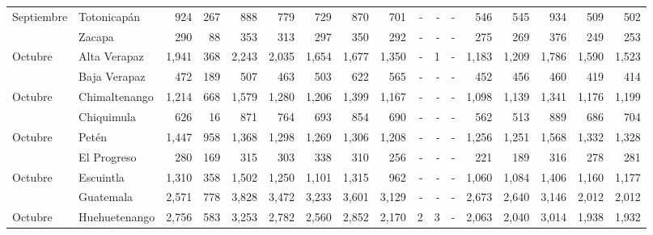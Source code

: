 \begin{landscape}
\begin{center}
\begin{longtable}{llrrrrrrrrrrrrrrr}
\multicolumn{1}{l}{	\footnotesize	 Septiembre 	}&	 Totonicapán 	&	 924 	&	 267 	&	 888 	&	 779 	&	 729 	&	 870 	&	 701 	&	 -   	&	 -   	&	 -   	&	 546 	&	 545 	&	 934 	&	 509 	&	 502 	\\
\rowcolor{color1!5!white}\multicolumn{1}{l}{	\footnotesize	 Septiembre 	}&	 Zacapa 	&	 290 	&	 88 	&	 353 	&	 313 	&	 297 	&	 350 	&	 292 	&	 -   	&	 -   	&	 -   	&	 275 	&	 269 	&	 376 	&	 249 	&	 253 	\\
\multicolumn{1}{l}{	\footnotesize	 Octubre 	}&	 Alta Verapaz 	&	 1,941 	&	 368 	&	 2,243 	&	 2,035 	&	 1,654 	&	 1,677 	&	 1,350 	&	 -   	&	 1 	&	 -   	&	 1,183 	&	 1,209 	&	 1,786 	&	 1,590 	&	 1,523 	\\
\rowcolor{color1!5!white}\multicolumn{1}{l}{	\footnotesize	 Octubre 	}&	 Baja Verapaz 	&	 472 	&	 189 	&	 507 	&	 463 	&	 503 	&	 622 	&	 565 	&	 -   	&	 -   	&	 -   	&	 452 	&	 456 	&	 460 	&	 419 	&	 414 	\\
\multicolumn{1}{l}{	\footnotesize	 Octubre 	}&	 Chimaltenango 	&	 1,214 	&	 668 	&	 1,579 	&	 1,280 	&	 1,206 	&	 1,399 	&	 1,167 	&	 -   	&	 -   	&	 -   	&	 1,098 	&	 1,139 	&	 1,341 	&	 1,176 	&	 1,199 	\\
\rowcolor{color1!5!white}\multicolumn{1}{l}{	\footnotesize	 Octubre 	}&	 Chiquimula 	&	 626 	&	 16 	&	 871 	&	 764 	&	 693 	&	 854 	&	 690 	&	 -   	&	 -   	&	 -   	&	 562 	&	 513 	&	 889 	&	 686 	&	 704 	\\
\multicolumn{1}{l}{	\footnotesize	 Octubre 	}&	 Petén 	&	 1,447 	&	 958 	&	 1,368 	&	 1,298 	&	 1,269 	&	 1,306 	&	 1,208 	&	 -   	&	 -   	&	 -   	&	 1,256 	&	 1,251 	&	 1,568 	&	 1,332 	&	 1,328 	\\
\rowcolor{color1!5!white}\multicolumn{1}{l}{	\footnotesize	 Octubre 	}&	 El Progreso 	&	 280 	&	 169 	&	 315 	&	 303 	&	 338 	&	 310 	&	 256 	&	 -   	&	 -   	&	 -   	&	 221 	&	 189 	&	 316 	&	 278 	&	 281 	\\
\multicolumn{1}{l}{	\footnotesize	 Octubre 	}&	 Escuintla 	&	 1,310 	&	 358 	&	 1,502 	&	 1,250 	&	 1,101 	&	 1,315 	&	 962 	&	 -   	&	 -   	&	 -   	&	 1,060 	&	 1,084 	&	 1,406 	&	 1,160 	&	 1,177 	\\
\rowcolor{color1!5!white}\multicolumn{1}{l}{	\footnotesize	 Octubre 	}&	 Guatemala 	&	 2,571 	&	 778 	&	 3,828 	&	 3,472 	&	 3,233 	&	 3,601 	&	 3,129 	&	 -   	&	 -   	&	 -   	&	 2,673 	&	 2,640 	&	 3,146 	&	 2,012 	&	 2,012 	\\
\multicolumn{1}{l}{	\footnotesize	 Octubre 	}&	 Huehuetenango 	&	 2,756 	&	 583 	&	 3,253 	&	 2,782 	&	 2,560 	&	 2,852 	&	 2,170 	&	 2 	&	 3 	&	 -   	&	 2,063 	&	 2,040 	&	 3,014 	&	 1,938 	&	 1,932 	\\

\end{longtable}
\end{center}
\end{landscape}
